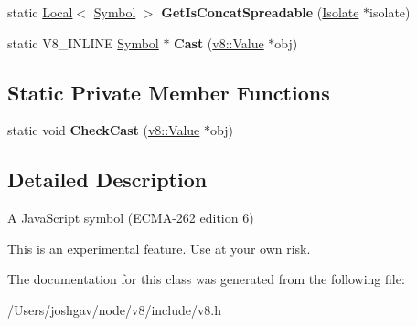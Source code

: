 \begin{DoxyCompactItemize}
\item 
static \hyperlink{classv8_1_1_local}{Local}$<$ \hyperlink{classv8_1_1_symbol}{Symbol} $>$ {\bfseries Get\+Is\+Concat\+Spreadable} (\hyperlink{classv8_1_1_isolate}{Isolate} $\ast$isolate)\hypertarget{classv8_1_1_symbol_acf0d506838dbf518537c17a72571c0bf}{}\label{classv8_1_1_symbol_acf0d506838dbf518537c17a72571c0bf}

\item 
static V8\+\_\+\+I\+N\+L\+I\+NE \hyperlink{classv8_1_1_symbol}{Symbol} $\ast$ {\bfseries Cast} (\hyperlink{classv8_1_1_value}{v8\+::\+Value} $\ast$obj)\hypertarget{classv8_1_1_symbol_a6bb214df5e2d8655379a648530aebaf1}{}\label{classv8_1_1_symbol_a6bb214df5e2d8655379a648530aebaf1}

\end{DoxyCompactItemize}
\subsection*{Static Private Member Functions}
\begin{DoxyCompactItemize}
\item 
static void {\bfseries Check\+Cast} (\hyperlink{classv8_1_1_value}{v8\+::\+Value} $\ast$obj)\hypertarget{classv8_1_1_symbol_aa323c1373809a7f2f6ffa9be34e81f5e}{}\label{classv8_1_1_symbol_aa323c1373809a7f2f6ffa9be34e81f5e}

\end{DoxyCompactItemize}


\subsection{Detailed Description}
A Java\+Script symbol (E\+C\+M\+A-\/262 edition 6)

This is an experimental feature. Use at your own risk. 

The documentation for this class was generated from the following file\+:\begin{DoxyCompactItemize}
\item 
/\+Users/joshgav/node/v8/include/v8.\+h\end{DoxyCompactItemize}
